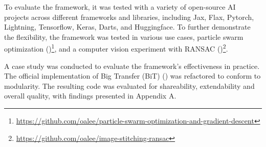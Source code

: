 To evaluate the framework, it was tested with a variety of open-source AI projects across different frameworks and libraries, including Jax, Flax, Pytorch, Lightning, Tensorflow, Keras, Darts, and Huggingface. To further demonstrate the flexibility, the framework was tested in various use cases, particle swarm optimization (\cite{kennedy1995particle})\footnote{\url{https://github.com/oalee/particle-swarm-optimization-and-gradient-descent}}, and a computer vision experiment with RANSAC (\cite{lowe2004distinctive})\footnote{\url{https://github.com/oalee/image-stitching-ransac}}.

A case study was conducted to evaluate the framework's effectiveness in practice. The official implementation of Big Transfer (BiT)  (\cite{transferlearning}) was refactored to conform to modularity. The resulting code was evaluated for shareability, extendability and overall quality, with findings presented in Appendix A.